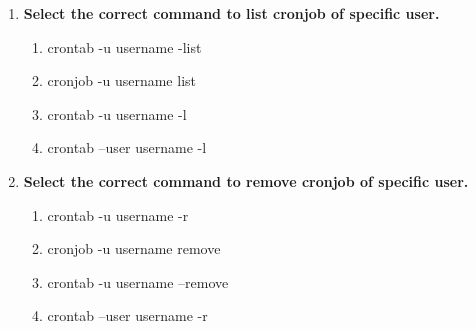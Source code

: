\begin{flushleft}
\begin{enumerate}
		\item \textbf{Select the correct command to list cronjob of specific user.}
		\begin{enumerate}[label=(\alph*)]
			\item crontab -u username -list
			\item cronjob -u username list
			\item crontab -u username -l  %
			\item crontab --user username -l
		\end{enumerate}
		\bigskip
		\bigskip	
		
		
		\item \textbf{Select the correct command to remove cronjob of specific user.}
		\begin{enumerate}[label=(\alph*)]
			\item crontab -u username -r  %
			\item cronjob -u username remove
			\item crontab -u username --remove  
			\item crontab --user username -r
		\end{enumerate}
		\bigskip
		\bigskip	
		
		
	\end{enumerate}
	
	
\end{flushleft}

\newpage

